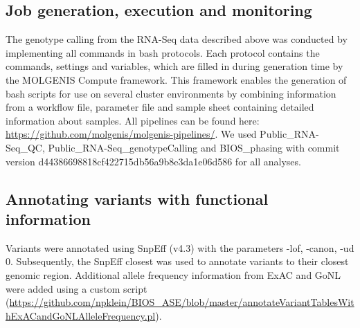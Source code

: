 \subsection{Job generation, execution and monitoring}
The genotype calling from the RNA-Seq data described above was conducted by implementing all commands in bash protocols. Each protocol contains the commands, settings and variables, which are filled in during generation time by the MOLGENIS Compute framework\cite{byelasMOLGENISBasedComputational2011}. This framework enables the generation of bash scripts for use on several cluster environments by combining information from a workflow file, parameter file and sample sheet containing detailed information about samples. All pipelines can be found here: \url{https://github.com/molgenis/molgenis-pipelines/}. We used Public\_RNA-Seq\_QC, Public\_RNA-Seq\_genotypeCalling and BIOS\_phasing with commit version d44386698818cf422715db56a9b8e3da1e06d586 for all analyses. 

\subsection{Annotating variants with functional information}
Variants were annotated using SnpEff\cite{cingolaniProgramAnnotatingPredicting2012} (v4.3) with the parameters -lof, -canon, -ud 0. Subsequently, the SnpEff closest was used to annotate variants to their closest genomic region. Additional allele frequency information from ExAC and GoNL were added using a custom script (\url{https://github.com/npklein/BIOS\_ASE/blob/master/annotateVariantTablesWithExACandGoNLAlleleFrequency.pl}).


